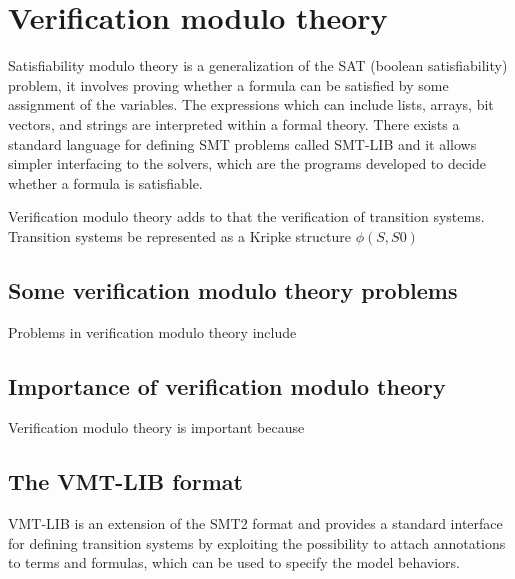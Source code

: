 \chapter{Verification modulo theory}

Satisfiability modulo theory is a generalization of the SAT (boolean satisfiability) problem, it involves proving whether a formula can be satisfied by some assignment of the variables. The expressions which can include lists, arrays, bit vectors, and strings are interpreted within a formal theory. There exists a standard language for defining SMT problems called SMT-LIB \cite{SMT-LIB} and it allows simpler interfacing to the solvers, which are the programs developed to decide whether a formula is satisfiable.

Verification modulo theory adds to that the verification of transition systems.
Transition systems be represented as a Kripke structure %
\begin{math}
    \phi(S, S0)
\end{math}


\section{Some verification modulo theory problems}
Problems in verification modulo theory include %

\section{Importance of verification modulo theory}
Verification modulo theory is important because %

\section{The VMT-LIB format}
VMT-LIB is an extension of the SMT2 format and provides a standard interface for defining transition systems by exploiting the possibility to attach annotations to terms and formulas, which can be used to specify the model behaviors. \cite{VMT-LIB}

